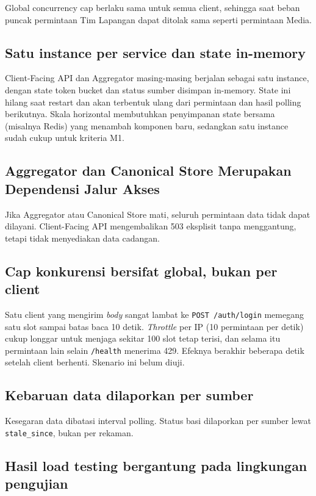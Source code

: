 Global concurrency cap berlaku sama untuk semua client, sehingga saat beban puncak permintaan Tim Lapangan dapat ditolak sama seperti permintaan Media.

\subsection{Satu instance per service dan state in-memory}

Client-Facing API dan Aggregator masing-masing berjalan sebagai satu instance, dengan state token bucket dan status sumber disimpan in-memory. State ini hilang saat restart dan akan terbentuk ulang dari permintaan dan hasil polling berikutnya. Skala horizontal membutuhkan penyimpanan state bersama (misalnya Redis) yang menambah komponen baru, sedangkan satu instance sudah cukup untuk kriteria M1.

\subsection{Aggregator dan Canonical Store Merupakan Dependensi Jalur Akses}

Jika Aggregator atau Canonical Store mati, seluruh permintaan data tidak dapat dilayani. Client-Facing API mengembalikan 503 eksplisit tanpa menggantung, tetapi tidak menyediakan data cadangan.

\subsection{Cap konkurensi bersifat global, bukan per client}

Satu client yang mengirim \textit{body} sangat lambat ke \texttt{POST /auth/login} memegang satu slot sampai batas baca 10 detik. \textit{Throttle} per IP (10 permintaan per detik) cukup longgar untuk menjaga sekitar 100 slot tetap terisi, dan selama itu permintaan lain selain \texttt{/health} menerima 429. Efeknya berakhir beberapa detik setelah client berhenti. Skenario ini belum diuji.

\subsection{Kebaruan data dilaporkan per sumber}

Kesegaran data dibatasi interval polling. Status basi dilaporkan per sumber lewat \texttt{stale\_since}, bukan per rekaman.

\subsection{Hasil load testing bergantung pada lingkungan pengujian}

